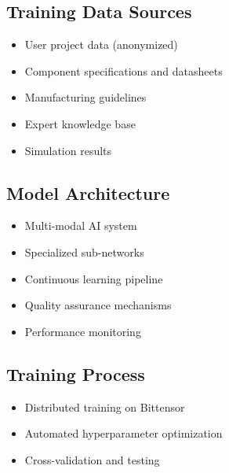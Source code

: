 \subsection{Training Data Sources}
\begin{itemize}[leftmargin=*]
    \item User project data (anonymized)
    \item Component specifications and datasheets
    \item Manufacturing guidelines
    \item Expert knowledge base
    \item Simulation results
\end{itemize}

\subsection{Model Architecture}
\begin{itemize}[leftmargin=*]
    \item Multi-modal AI system
    \item Specialized sub-networks
    \item Continuous learning pipeline
    \item Quality assurance mechanisms
    \item Performance monitoring
\end{itemize}

\subsection{Training Process}
\begin{itemize}[leftmargin=*]
    \item Distributed training on Bittensor
    \item Automated hyperparameter optimization
    \item Cross-validation and testing
\end{itemize}